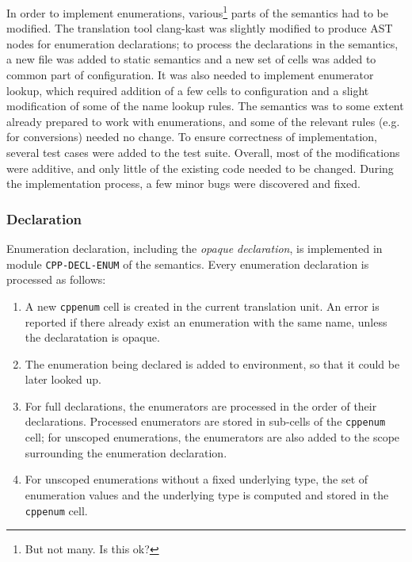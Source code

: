 \documentclass{fithesis3}
\begin{document}

In order to implement enumerations, various\footnote{But not many. Is this ok?} parts of the semantics had to be modified. The translation tool clang-kast was slightly modified to produce AST nodes for enumeration declarations; to process the declarations in the semantics, a new file was added to static semantics and a new set of cells was added to common part of configuration. It was also needed to implement enumerator lookup, which required addition of a few cells to configuration and a slight modification of some of the name lookup rules. The semantics was to some extent already prepared to work with enumerations, and some of the relevant rules (e.g. for conversions) needed no change. To ensure correctness of implementation, several test cases were added to the test suite. Overall, most of the modifications were additive, and only little of the existing code needed to be changed. During the implementation process, a few minor bugs were discovered and fixed. 


\subsubsection{Declaration}

Enumeration declaration, including the \textit{opaque declaration}, is implemented in module \texttt{CPP-DECL-ENUM} of the semantics.
Every enumeration declaration is processed as follows:
\begin{enumerate}
\item A new \texttt{cppenum} cell is created in the current translation unit. An error is reported if there already exist an enumeration with the same name, unless the declaratation is opaque.
\item The enumeration being declared is added to environment, so that it could be later looked up.
\item For full declarations, the enumerators are processed in the order of their declarations. Processed enumerators are stored in sub-cells of the \texttt{cppenum} cell; for unscoped enumerations, the enumerators are also added to the scope surrounding the enumeration declaration.
\item For unscoped enumerations without a fixed underlying type, the set of enumeration values and the underlying type is computed and stored in the \texttt{cppenum} cell.
\end{enumerate}
\end{document}
